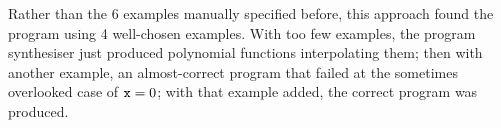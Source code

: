 \documentclass[a4paper,twoside,notitlepage]{report}
\begin{document}
Rather than the 6 examples manually specified before, this approach found 
the program using 4 well-chosen examples. With too few examples, the 
program synthesiser just produced polynomial functions interpolating them; 
then with another example, an almost-correct program that failed at the 
sometimes overlooked case of $\verb|x|=0$; with that example added, the 
correct program was produced.

\begin{comment}
\chapter{Separate Synthesis of Subprograms} \label{chp:gensub}
\section{Extensions to the Task Specification Language}
\section{Separate Synthesis of Loop Bodies}

\chapter{Evaluation}
\section{Power and Accuracy}
\subsection{Extent of Capabilities}
\subsection{Correctness of Generated Programs}
\section{Efficiency}
\subsection{Time and Space Usage}
\subsection{Number of Examples Needed}
\subsection{Quality of Generated Programs}

\end{comment}
\end{document}
